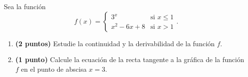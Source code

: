 
Sea la función
\[
f(x)=\begin{cases}3^x&\text{si }x\leq1\\x^2-6x+8&\text{si }x>1\end{cases}.
\]
\begin{enumerate}[label=\alph*)]
\item \textbf{(2 puntos)} Estudie la continuidad y la derivabilidad de la función $f$.
\item \textbf{(1 punto)} Calcule la ecuación de la recta tangente a la gráfica de la función $f$ en el punto de abscisa $x=3$.
\end{enumerate}
